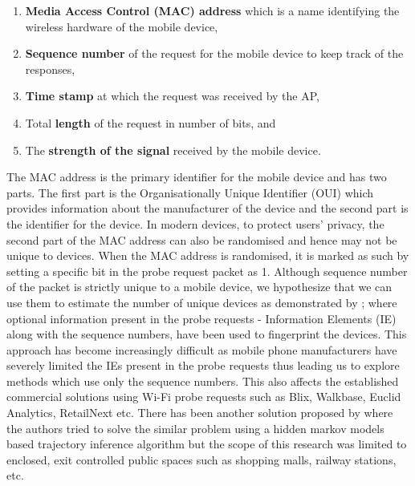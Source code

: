 \begin{enumerate} 
\item \textbf{Media Access Control (MAC) address} which is a name identifying the wireless hardware of the mobile device, 
\item \textbf{Sequence number} of the request for the mobile device to keep track of the responses, 
\item \textbf{Time stamp} at which the request was received by the AP, 
\item Total \textbf{length} of the request in number of bits, and 
\item The \textbf{strength of the signal} received by the mobile device.
\end{enumerate}

The MAC address is the primary identifier for the mobile device and has two parts.
The first part is the Organisationally Unique Identifier (OUI) which provides information about the manufacturer of the device and the second part is the identifier for the device.
In modern devices, to protect users' privacy, the second part of the MAC address can also be randomised and hence may not be unique to devices.
When the MAC address is randomised, it is marked as such by setting a specific bit in the probe request packet as 1.
Although sequence number of the packet is strictly unique to a mobile device, we hypothesize that we can use them to estimate the number of unique devices as demonstrated by \citep{vanhoef2016}; where optional information present in the probe requests - Information Elements (IE) along with the sequence numbers, have been used to fingerprint the devices.
This approach has become increasingly difficult as mobile phone manufacturers have severely limited the IEs present in the probe requests thus leading us to explore methods which use only the sequence numbers.
This also affects the established commercial solutions using Wi-Fi probe requests such as Blix, Walkbase, Euclid Analytics, RetailNext etc.
There has been another solution proposed by \citep{hong2018crowdprobe} where the authors tried to solve the similar problem using a hidden markov models based trajectory inference algorithm but the scope of this research was limited to enclosed, exit controlled public spaces such as shopping malls, railway stations, etc.

